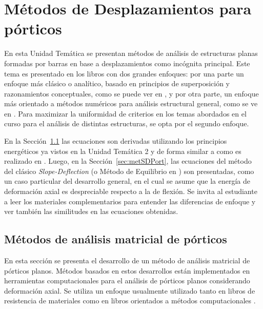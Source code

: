 

\chapter[Métodos de Desplazamientos para pórticos]{Métodos de Desplazamientos para pórticos}

En esta Unidad Temática se presentan métodos de análisis de estructuras planas formadas por barras en base a desplazamientos como incógnita principal. %
%
Este tema es presentado en los libros con dos grandes enfoques: por una parte un enfoque más clásico o analítico, basado en principios de superposición y razonamientos conceptuales, como se puede ver en \citep{Timoshenko1940a,CerveraRuiz2002ii}, y por otra parte, un enfoque más orientado a métodos numéricos para análisis estructural general, como se ve en \citep{Onate2013,Pilkey2002,Wunderlich2002}. %
%
Para maximizar la uniformidad de criterios en los temas abordados en el curso para el análisis de distintas estructuras, se opta por el segundo enfoque. %

En la Sección~\ref{sec:analiMatPort} las ecuaciones son derivadas utilizando los principios energéticos ya vistos en la Unidad Temática 2 y de forma similar a como es realizado en \citep{Reddy2002b}. %
%
Luego, en la Sección~\ref{sec:metSDPort}, las ecuaciones del método del clásico \textit{Slope-Deflection} (o Método de Equilibrio en \citep{CerveraRuiz2002ii}) son presentadas, como un caso particular del desarrollo general, en el cual se asume que la energía de deformación axial es despreciable respecto a la de flexión. %
%
Se invita al estudiante a leer los materiales complementarios para entender las diferencias de enfoque y ver también las similitudes en las ecuaciones obtenidas.




\section{Métodos de análisis matricial de pórticos} \label{sec:analiMatPort}

En esta sección se presenta el desarrollo de un método de análisis matricial de pórticos planos. %
%
Métodos basados en estos desarrollos están implementados en herramientas computacionales para el análisis de pórticos planos considerando deformación axial. %
Se utiliza un enfoque usualmente utilizado tanto en libros de resistencia de materiales \citep{Pilkey2002} como en libros orientados a métodos computacionales \citep{Onate2013}. %


